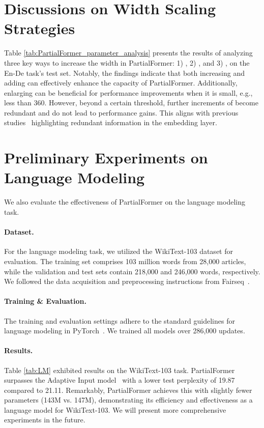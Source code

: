 \documentclass[11pt]{article}
\begin{document}
\section{Discussions on Width Scaling Strategies}
Table \ref{tab:PartialFormer_parameter_analysis} presents the results of analyzing three key ways to increase the width in PartialFormer: 1) , 2) , and 3) , on the En-De task's test set. Notably, the findings indicate that both increasing  and adding  can effectively enhance the capacity of PartialFormer. Additionally, enlarging  can be beneficial for performance improvements when it is small, e.g., less than 360. However, beyond a certain threshold, further increments of  become redundant and do not lead to performance gains. This aligns with previous studies~\cite{Mehta2021Delight, Baevski2019AdaptiveInput} highlighting redundant information in the embedding layer.



\section{Preliminary Experiments on Language Modeling}
We also evaluate the effectiveness of PartialFormer on the language modeling task.
\paragraph{Dataset.} For the language modeling task, we utilized the WikiText-103 dataset for evaluation. The training set comprises 103 million words from 28,000 articles, while the validation and test sets contain 218,000 and 246,000 words, respectively. We followed the data acquisition and preprocessing instructions from Fairseq~\cite{ott-etal-2019-fairseq}. 

\paragraph{Training \& Evaluation.} The training and evaluation settings adhere to the standard guidelines for language modeling in PyTorch~\cite{ott-etal-2019-fairseq}. We trained all models over 286,000 updates.

\paragraph{Results.}

Table \ref{tab:LM} exhibited results on the WikiText-103 task. PartialFormer surpasses the Adaptive Input model~\cite{Baevski2019AdaptiveInput} with a lower test perplexity of 19.87 compared to 21.11. Remarkably, PartialFormer achieves this with slightly fewer parameters (143M vs. 147M), demonstrating its efficiency and effectiveness as a language model for WikiText-103. We will present more comprehensive experiments in the future.
\end{document}
